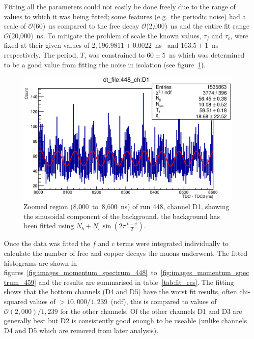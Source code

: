 Fitting all the parameters could not easily be done freely due to the range of values to which it was being fitted; some features (e.g.\ the periodic noise) had a scale of \(\mathcal{O}\)(60)~ns compared to the free decay \(\mathcal{O}\)(2,000)~ns and the entire fit range \(\mathcal{O}\)(20,000)~ns. To mitigate the problem of scale the known values, \(\tau_{f}\) and \(\tau_{c}\), were fixed at their given values of \(2,196.9811\pm0.0022 \)~ns~\cite{pdg} and \( 163.5\pm1 \)~ns~\cite{suzuki_mu_capture_rates} respectively. The period, \(T\), was constrained to \(60\pm5\)~ns which was determined to be a good value from fitting the noise in isolation (see figure~\ref{fig:images_momentum_spectrum_448_D1_noise_fit}).

\begin{figure}[hptb]
  \centering
    \includegraphics[width=.9\textwidth]{images/momentum_spectrum/448_D1_noise_fit.eps}
  \caption{Zoomed region (8,000~to~8,600~ns) of run 448, channel D1, showing the sinusoidal component of the background, the background has been fitted using \(N_b + N_s\sin(2\pi\frac{t-\phi}{T})\).}
  \label{fig:images_momentum_spectrum_448_D1_noise_fit}
\end{figure}

Once the data was fitted the \(f\) and \(c\) terms were integrated individually to calculate the number of free and copper decays the muons underwent. The fitted histograms are shown in figures~\ref{fig:images_momentum_spectrum_448}~to~\ref{fig:images_momentum_spectrum_459} and the results are summarised in table~\ref{tab:fit_res}. The fitting shows that the bottom channels (D4 and D5) have the worst fit results, often chi-squared values of \(>10,000 / 1,239\)~(ndf), this is compared to values of \(\mathcal{O}(2,000) / 1,239\) for the other channels. Of the other channels D1 and D3 are generally best but D2 is consistently good enough to be useable (unlike channels D4 and D5 which are removed from later analysis).

